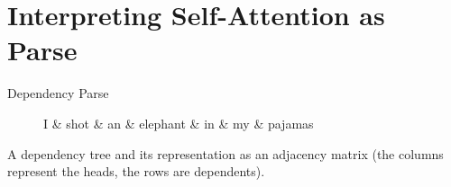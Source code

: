 \documentclass{beamer}
\begin{document}
\section{Interpreting Self-Attention as Parse}

\begin{frame}{Dependency Parse}
\begin{figure}[t]
    \begin{minipage}[b]{0.50\linewidth}
        \centering
        \begin{dependency}
            \begin{deptext}
            I \& shot \& an \& elephant \& in \& my \& pajamas \\
            \end{deptext}
        \end{dependency}
    \end{minipage}%
    \begin{minipage}[b]{0.50\linewidth}
        \centering
    \end{minipage}
    \label{fig:deptree-vs-matrix}
\end{figure}
A dependency tree and its representation as an adjacency matrix (the columns represent the heads, the rows are dependents).
\end{frame}
\end{document}
